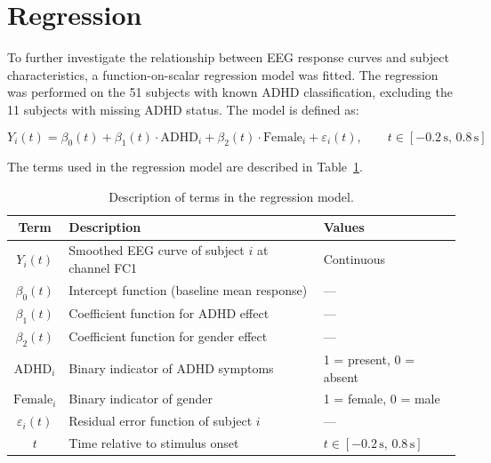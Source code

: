 \documentclass[twoside,11pt]{article}
\begin{document}
\section{Regression}

To further investigate the relationship between EEG response curves and subject characteristics, a
function-on-scalar regression model was fitted. The regression was performed on the 51 subjects with
known ADHD classification, excluding the 11 subjects with missing ADHD status. The model is defined
as:

\begin{equation}
  Y_i(t) = \beta_0(t) + \beta_1(t) \cdot \text{ADHD}_i + \beta_2(t) \cdot \text{Female}_i +
  \varepsilon_i(t), \qquad t \in [-0.2\,\mathrm{s},\, 0.8\,\mathrm{s}]
\end{equation}

The terms used in the regression model are described in Table~\ref{tab:model_terms}.

\begin{table}[ht]
  \centering
  \begin{tabular}{cll}
    \toprule
    \textbf{Term} & \textbf{Description} & \textbf{Values} \\
    \midrule

    $Y_i(t)$
    & Smoothed EEG curve of subject $i$ at channel FC1
    & Continuous \\

    $\beta_0(t)$
    & Intercept function (baseline mean response)
    & --- \\

    $\beta_1(t)$
    & Coefficient function for ADHD effect
    & --- \\

    $\beta_2(t)$
    & Coefficient function for gender effect
    & --- \\

    $\text{ADHD}_i$
    & Binary indicator of ADHD symptoms
    & 1 = present, 0 = absent \\

    $\text{Female}_i$
    & Binary indicator of gender
    & 1 = female, 0 = male \\

    $\varepsilon_i(t)$
    & Residual error function of subject $i$
    & --- \\

    $t$
    & Time relative to stimulus onset
    & $t \in [-0.2\,\mathrm{s},\, 0.8\,\mathrm{s}]$ \\

    \bottomrule
  \end{tabular}
  \caption{Description of terms in the regression model.}
  \label{tab:model_terms}
\end{table}
\end{document}

